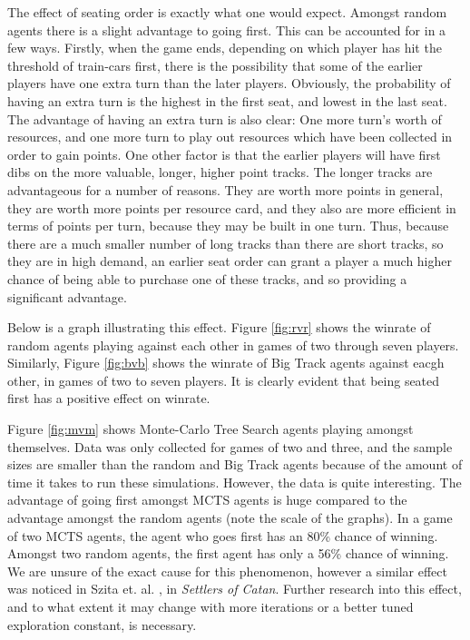 \documentclass[11pt, letterpaper, twoside]{article}
\begin{document}
The effect of seating order is exactly what one would expect. Amongst random agents there is a slight advantage to going first. This can be accounted for in a few ways. Firstly, when the game ends, depending on which player has hit the threshold of train-cars first, there is the possibility that some of the earlier players have one extra turn than the later players. Obviously, the probability of having an extra turn is the highest in the first seat, and lowest in the last seat. The advantage of having an extra turn is also clear: One more turn's worth of resources, and one more turn to play out resources which have been collected in order to gain points. One other factor is that the earlier players will have first dibs on the more valuable, longer, higher point tracks. The longer tracks are advantageous for a number of reasons. They are worth more points in general, they are worth more points per resource card, and they also are more efficient in terms of points per turn, because they may be built in one turn. Thus, because there are a much smaller number of long tracks than there are short tracks, so they are in high demand, an earlier seat order can grant a player a much higher chance of being able to purchase one of these tracks, and so providing a significant advantage.

Below is a graph illustrating this effect. Figure \ref{fig:rvr} shows the winrate of random agents playing against each other in games of two through seven players. Similarly, Figure \ref{fig:bvb} shows the winrate of Big Track agents against eacgh other, in games of two to seven players. It is clearly evident that being seated first has a positive effect on winrate. 

Figure \ref{fig:mvm} shows Monte-Carlo Tree Search agents playing amongst themselves. Data was only collected for games of two and three, and the sample sizes are smaller than the random and Big Track agents because of the amount of time it takes to run these simulations. However, the data is quite interesting. The advantage of going first amongst MCTS agents is huge compared to the advantage amongst the random agents (note the scale of the graphs). In a game of two MCTS agents, the agent who goes first has an 80\% chance of winning. Amongst two random agents, the first agent has only a 56\% chance of winning. We are unsure of the exact cause for this phenomenon, however a similar effect was noticed in Szita et. al. \cite{mcts_settlers}, in \textit{Settlers of Catan}. Further research into this effect, and to what extent it may change with more iterations or a better tuned exploration constant, is necessary.
\end{document}

